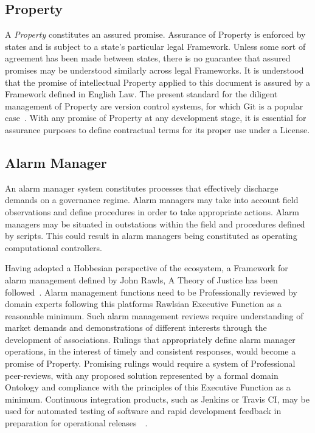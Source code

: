 \documentclass[11pt, oneside]{article}   	%
\begin{document}
\pagebreak

\subsection{Property}
A \emph{Property} constitutes an assured promise.
Assurance of Property is enforced by states and is subject to a state's particular legal Framework.
Unless some sort of agreement has been made between states, there is no guarantee that assured promises may be understood similarly across legal Frameworks.
It is understood that the promise of intellectual Property applied to this document is assured by a Framework defined in English Law.
The present standard for the diligent management of Property are version control systems, for which Git is a popular case~\cite{git}.
With any promise of Property at any development stage, it is essential for assurance purposes to define contractual terms for its proper use under a License.

\subsection{Alarm Manager}
An alarm manager system constitutes processes that effectively discharge demands on a governance regime.
Alarm managers may take into account field observations and define procedures in order to take appropriate actions.
Alarm managers may be situated in outstations within the field and procedures defined by scripts.
This could result in alarm managers being constituted as operating computational controllers.\

Having adopted a Hobbesian perspective of the ecosystem, a Framework for alarm management defined by John Rawls, A Theory of Justice has been followed~\cite{jr1}.
Alarm management functions need to be Professionally reviewed by domain experts following this platforms Rawlsian Executive Function as a reasonable minimum.
Such alarm management reviews require understanding of market demands and demonstrations of different interests through the development of associations.
Rulings that appropriately define alarm manager operations, in the interest of timely and consistent responses, would become a promise of Property.
Promising rulings would require a system of Professional peer-reviews, with any proposed solution represented by a formal domain Ontology and compliance with the principles of this Executive Function as a minimum.
Continuous integration products, such as Jenkins or Travis CI, may be used for automated testing of software and rapid development feedback in preparation for operational releases~\cite{jenkins}~\cite{travis}.\
\end{document}
